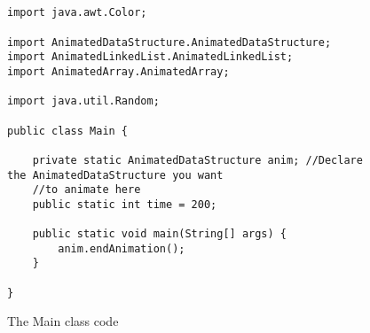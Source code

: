 \begin{figure}
\begin{center}
\begin{verbatim}


import java.awt.Color;

import AnimatedDataStructure.AnimatedDataStructure;
import AnimatedLinkedList.AnimatedLinkedList;
import AnimatedArray.AnimatedArray;

import java.util.Random;

public class Main {

    private static AnimatedDataStructure anim; //Declare the AnimatedDataStructure you want
    //to animate here
    public static int time = 200;

    public static void main(String[] args) {
        anim.endAnimation();
    }

}

\end{verbatim}
\end{center}
\caption{The Main class code}
\label{fig:main}
\end{figure}